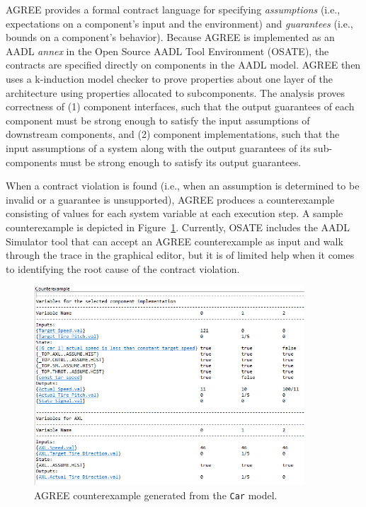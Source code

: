 \label{Overview}
AGREE provides a formal contract language for specifying \textit{assumptions} (i.e., expectations on a component's input and the environment) and \textit{guarantees} (i.e., bounds on a component's behavior).  Because AGREE is implemented as an AADL \textit{annex} in the Open Source AADL Tool Environment (OSATE), the contracts are specified directly on components in the AADL model.  AGREE then uses a k-induction model checker to prove properties about one layer of the architecture using properties allocated to subcomponents. The analysis proves correctness of (1) component interfaces, such that the output guarantees of each component must be strong enough to satisfy the input assumptions of downstream components, and (2) component implementations, such that the input assumptions of a system along with the output guarantees of its sub-components must be strong enough to satisfy its output guarantees.

When a contract violation is found (i.e., when an assumption is determined to be invalid or a guarantee is unsupported), AGREE produces a counterexample consisting of values for each system variable at each execution step.  A sample counterexample is depicted in Figure~\ref{fig:cex}.  Currently, OSATE includes the AADL Simulator tool that can accept an AGREE counterexample as input and walk through the trace in the graphical editor, but it is of limited help when it comes to identifying the root cause of the contract violation.


\begin{figure}[t] 
	\centering 
\includegraphics[height=0.6\textwidth, width=0.9\textwidth]{cex.png}
	\caption{AGREE counterexample generated from the \texttt{Car} model.}
	\label{fig:cex} 
\end{figure}

%






